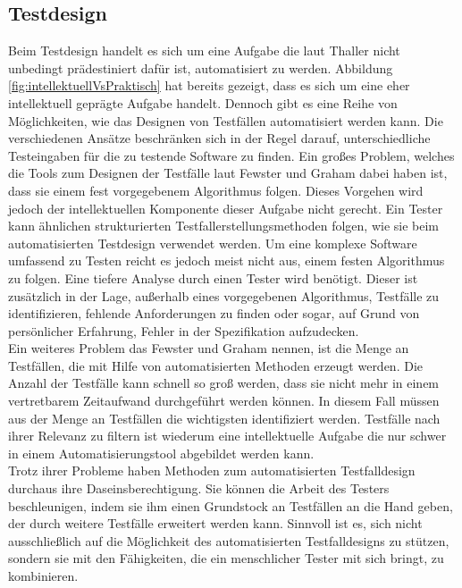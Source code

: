 \subsection{Testdesign}
\label{subsec:testdesign}
Beim Testdesign handelt es sich um eine Aufgabe die laut Thaller \cite[vgl. S. 231]{thaller_software-test_2002} nicht unbedingt prädestiniert dafür ist, automatisiert zu werden. Abbildung \ref{fig:intellektuellVsPraktisch} hat bereits gezeigt, dass es sich um eine eher intellektuell geprägte Aufgabe handelt.
Dennoch gibt es eine Reihe von Möglichkeiten, wie das Designen von Testfällen automatisiert werden kann. Die verschiedenen Ansätze beschränken sich in der Regel darauf, unterschiedliche Testeingaben für die zu testende Software zu finden.
Ein großes Problem, welches die Tools zum Designen der Testfälle laut Fewster und Graham \cite[vgl. S. 19]{fewster_software_1999} dabei haben ist, dass sie einem fest vorgegebenem Algorithmus folgen. Dieses Vorgehen wird jedoch der intellektuellen Komponente dieser Aufgabe nicht gerecht. Ein Tester kann ähnlichen strukturierten Testfallerstellungsmethoden folgen, wie sie beim automatisierten Testdesign verwendet werden. Um eine komplexe Software umfassend zu Testen reicht es jedoch meist nicht aus, einem festen Algorithmus zu folgen. Eine tiefere Analyse durch einen Tester wird benötigt. Dieser ist zusätzlich in der Lage, außerhalb eines vorgegebenen Algorithmus, Testfälle zu identifizieren, fehlende Anforderungen zu finden oder sogar, auf Grund von persönlicher Erfahrung, Fehler in der Spezifikation aufzudecken.\\
Ein weiteres Problem das Fewster und Graham \cite[vgl. S. 19]{fewster_software_1999} nennen, ist die Menge an Testfällen, die mit Hilfe von automatisierten Methoden erzeugt werden. Die Anzahl der Testfälle kann schnell so groß werden, dass sie nicht mehr in einem vertretbarem Zeitaufwand durchgeführt werden können. In diesem Fall müssen aus der Menge an Testfällen die wichtigsten identifiziert werden. Testfälle nach ihrer Relevanz zu filtern ist wiederum eine intellektuelle Aufgabe die nur schwer in einem Automatisierungstool abgebildet werden kann.\\
Trotz ihrer Probleme haben Methoden zum automatisierten Testfalldesign durchaus ihre Daseinsberechtigung. Sie können die Arbeit des Testers beschleunigen, indem sie ihm einen Grundstock an Testfällen an die Hand geben, der durch weitere Testfälle erweitert werden kann. Sinnvoll ist es, sich nicht ausschließlich auf die Möglichkeit des automatisierten Testfalldesigns zu stützen, sondern sie mit den Fähigkeiten, die ein menschlicher Tester mit sich bringt, zu kombinieren.\\
